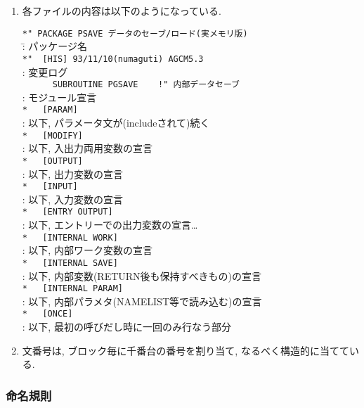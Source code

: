 \begin{enumerate}
\item 各ファイルの内容は以下のようになっている. 
\begin{tabbing}
\verb+*" PACKAGE PSAVE データのセーブ/ロード(実メモリ版) + \\
\hspace*{15mm}  \=  : パッケージ名      \\
\verb+*"  [HIS] 93/11/10(numaguti) AGCM5.3+ \\
                \>  : 変更ログ \\
\verb+      SUBROUTINE PGSAVE    !" 内部データセーブ+ \\
                \>  : モジュール宣言 \\
\verb+*   [PARAM]+ \\
                \>  : 以下, パラメータ文が(includeされて)続く \\
\verb+*   [MODIFY] + \\
                \>  : 以下, 入出力両用変数の宣言 \\
\verb+*   [OUTPUT] + \\
                \>  : 以下, 出力変数の宣言 \\
\verb+*   [INPUT] + \\
                \>  : 以下, 入力変数の宣言 \\
\verb+*   [ENTRY OUTPUT] + \\
                \>  : 以下, エントリーでの出力変数の宣言\ldots \\
\verb+*   [INTERNAL WORK] + \\
                \>  : 以下, 内部ワーク変数の宣言 \\
\verb+*   [INTERNAL SAVE]+ \\
                \>  : 以下, 内部変数(RETURN後も保持すべきもの)の宣言\\
\verb+*   [INTERNAL PARAM]+ \\
                \>  : 以下, 内部パラメタ(NAMELIST等で読み込む)の宣言\\
\verb+*   [ONCE]+ \\
                \>  : 以下, 最初の呼びだし時に一回のみ行なう部分 \\
\end{tabbing}

\item 文番号は, ブロック毎に千番台の番号を割り当て,
  なるべく構造的に当てている.

\end{enumerate}


\subsubsection{命名規則}

